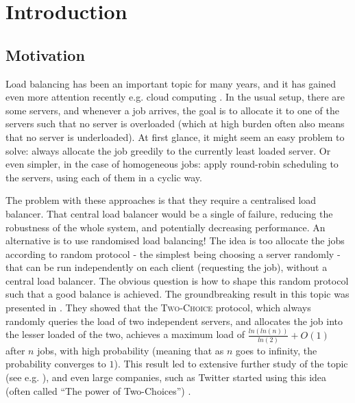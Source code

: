 \chapter{Introduction}\label{introduction}

\ifpdf
    \graphicspath{{Chapter1/Figs/Raster/}{Chapter1/Figs/PDF/}{Chapter1/Figs/}}
\else
    \graphicspath{{Chapter1/Figs/Vector/}{Chapter1/Figs/}}
\fi


\section{Motivation}

Load balancing has been an important topic for many years, and it has gained even more attention recently e.g. cloud computing \cite{mishra2020cloud}. In the usual setup, there are some servers, and whenever a job arrives, the goal is to allocate it to one of the servers such that no server is overloaded (which at high burden often also means that no server is underloaded). At first glance, it might seem an easy problem to solve: always allocate the job greedily to the currently least loaded server. Or even simpler, in the case of homogeneous jobs: apply round-robin scheduling to the servers, using each of them in a cyclic way. 

The problem with these approaches is that they require a centralised load balancer. That central load balancer would be a single of failure, reducing the robustness of the whole system, and potentially decreasing performance. An alternative is to use randomised load balancing! The idea is too allocate the jobs according to random protocol - the simplest being choosing a server randomly - that can be run independently on each client (requesting the job), without a central load balancer. The obvious question is how to shape this random protocol such that a good balance is achieved. The groundbreaking result in this topic was presented in \cite{azar1999twochoice}. They showed that the \textsc{Two-Choice} protocol, which always randomly queries the load of two independent servers, and allocates the job into the lesser loaded of the two, achieves a maximum load of $\frac{ln(ln(n))}{ln(2)} + O(1)$ after $n$ jobs, with high probability (meaning that as $n$ goes to infinity, the probability converges to $1$). This result led to extensive further study of the topic (see e.g. \cite{richa2001surveytwochoice}), and even large companies, such as Twitter started using this idea (often called ``The power of Two-Choices'') \cite{anderson2019twitter}.


